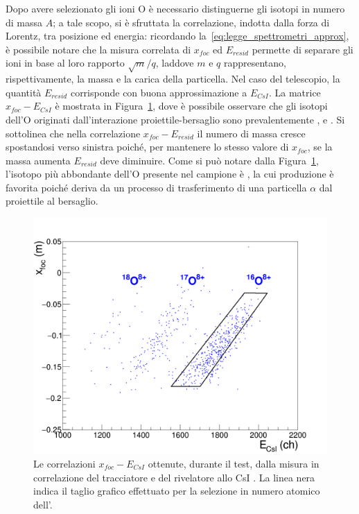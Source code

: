 Dopo avere selezionato gli ioni O è necessario distinguerne gli isotopi in numero di massa $A$; a tale scopo, si è sfruttata la correlazione, indotta dalla forza di Lorentz, tra posizione ed energia: ricordando la~\ref{eq:legge_spettrometri_approx}, è possibile notare che la misura correlata di $x_{foc}$ ed $E_{resid}$ permette di separare gli ioni in base al loro rapporto $\sqrt{m}/q$, laddove $m$ e $q$ rappresentano, rispettivamente, la massa e la carica della particella.
Nel caso del telescopio, la quantità $E_{resid}$ corrisponde con buona approssimazione a $E_{CsI}$.
La matrice $x_{foc} - E_{CsI}$ è mostrata in Figura~\ref{fig:xfoc2_csi_standard}, dove è possibile osservare che gli isotopi dell'O originati dall'interazione proiettile-bersaglio sono prevalentemente ,  e .
Si sottolinea che nella correlazione $x_{foc} - E_{resid}$ il numero di massa cresce spostandosi verso sinistra poiché, per mantenere lo stesso valore di $x_{foc}$, se la massa aumenta $E_{resid}$ deve diminuire.
Come si può notare dalla Figura~\ref{fig:xfoc2_csi_standard}, l'isotopo più abbondante dell'O presente nel campione è , la cui produzione è favorita poiché deriva da un processo di trasferimento di una particella $\alpha$ dal proiettile al bersaglio. 

\begin{figure} [!p]
	\centering
	\includegraphics[width=\textwidth, keepaspectratio]{Grafici_Tesi/Test/matrice_xfoc2_csi_taglio2.png}
	\caption{Le correlazioni $x_{foc} - E_{CsI}$ ottenute, durante il test, dalla misura in correlazione del tracciatore e del rivelatore allo CsI . La linea nera indica il taglio grafico effettuato per la selezione in numero atomico dell'.} \label{fig:xfoc2_csi_standard}
\end{figure}




